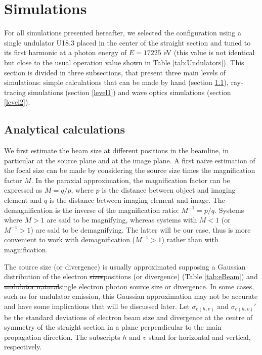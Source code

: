 \documentclass{iucr}              %
\newcommand{\inblue}[1]{{\color{blue}#1}}
\begin{document}
\section{Simulations}
\label{Simulations}

For all simulations presented hereafter, we selected the configuration using a single undulator U18.3 placed in the center of the straight section and tuned to its first harmonic at a photon energy of $E=17225$ eV (\inblue{this value is not identical but close to the usual operation value shown in }Table \ref{tab:Undulators}). This section is divided in three subsections, that present three main levels of simulations: simple calculations that can be made by hand (section \ref{level0}), ray-tracing simulations (section \ref{level1}) and wave optics simulations (section \ref{level2}).   

\subsection{Analytical calculations}
\label{level0}

We first estimate the beam size at different positions in the beamline, in particular at the source plane and at the image plane. A first na{\"{i}}ve estimation of the focal size can be made by considering the source size times the magnification factor $M$. In the paraxial approximation, the magnification factor can be expressed as $M=q/p$, where $p$ is the distance between object and imaging element and $q$ is the distance between imaging element and image. The demagnification is the inverse of the magnification ratio: $M^{-1}=p/q$. Systems where $M>1$ are said to be magnifying, whereas systems with $M<1$ (or $M^{-1}>1$) are said to be demagnifying. The latter will be our case, thus is more convenient to work with demagnification ($M^{-1}>1$) rather than with magnification. 

The source size (or divergence) is usually approximated supposing a Gaussian distribution of the electron {\color{green}\sout{sizes}positions} (or divergence) (Table \ref{tab:eBeam}) and {\color{green}\sout{undulator natural}single electron photon} source size or divergence. In some cases, such as for undulator emission, this Gaussian approximation may not be accurate and have some implications that will be discussed later. Let $\sigma_{e(h,v)}$ and $\sigma_{e(h,v)}'$ be the standard deviations of electron beam size and divergence  at the centre of  symmetry of the straight section in a plane perpendicular to the main propagation direction. The subscripts $h$ and $v$ stand for horizontal and vertical, respectively. 
\end{document}
